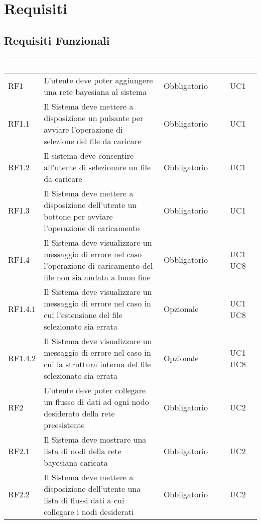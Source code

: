 \section{Requisiti}\label{Requisiti}

\subsection{Requisiti Funzionali}\label{RF}
\begin{center}
\begin{longtable}[c]{|m{}|m{}|m{}|m{}|}
\hline
\rowcolor{bluelogo}\textbf{\textcolor{white}{ID}} & \textbf{\textcolor{white}{Descrizione}} & \textbf{\textcolor{white}{Obbligatorietà}} & \textbf{\textcolor{white}{Fonti}}\\
\hline \hline
\endfirsthead
RF1 & L'utente deve poter aggiungere una rete bayesiana al sistema & Obbligatorio & UC1\\
\hline
\rowcolor{grigio}RF1.1 & Il Sistema deve mettere a disposizione un pulsante per avviare l'operazione di selezione del file da caricare & Obbligatorio & UC1\\
\hline
RF1.2 & Il sistema deve consentire all'utente di selezionare un file da caricare & Obbligatorio & UC1\\
\hline
\rowcolor{grigio}RF1.3 & Il Sistema deve mettere a disposizione dell'utente un bottone per avviare l'operazione di caricamento & Obbligatorio & UC1\\
\hline
RF1.4 & Il Sistema deve visualizzare un messaggio di errore nel caso l'operazione di caricamento del file non sia andata a buon fine & Obbligatorio & UC1 UC8\\
\hline
\rowcolor{grigio}RF1.4.1 & Il Sistema deve visualizzare un messaggio di errore nel caso in cui l'estensione del file selezionato sia errata & Opzionale & UC1 UC8\\
\hline
RF1.4.2 & Il Sistema deve visualizzare un messaggio di errore nel caso in cui la struttura interna del file selezionato sia errata & Opzionale & UC1 UC8\\
\hline
\rowcolor{grigio}RF2 & L'utente deve poter collegare un flusso di dati ad ogni nodo desiderato della rete preesistente & Obbligatorio & UC2\\
\hline
RF2.1 & Il Sistema deve mostrare una lista di nodi della rete bayesiana caricata & Obbligatorio & UC2\\
\hline
\rowcolor{grigio}RF2.2 & Il Sistema deve mettere a disposizione dell'utente una lista di flussi dati a cui collegare i nodi desiderati & Obbligatorio & UC2\\

\end{longtable}
\end{center}
